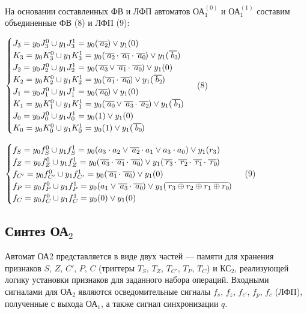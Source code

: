 На основании составленных ФВ и ЛФП автоматов ОА$^{(0)}_{1}$ и ОА$^{(1)}_{1}$ составим объединенные ФВ (8) и ЛФП (9):

$
\begin{cases}
J_3 = y_0 J^0_3 \cup y_1 J^1_3 = y_0 (\oline{a_2}) \vee y_1(0)
\\
K_3 = y_0 K^0_3 \cup y_1 K^1_3 = y_0 (\oline{a_2} \cdot \oline{a_1} \cdot \oline{a_0}) \vee y_1(\oline{b_3})
\\
J_2 = y_0 J^0_2 \cup y_1 J^1_2 = y_0 (\oline{a_3} \vee \oline{a_1} \cdot \oline{a_0}) \vee y_1(0)
\\
K_2 = y_0 K^0_2 \cup y_1 K^1_2 = y_0 (\oline{a_1} \cdot \oline{a_0}) \vee y_1(\oline{b_2})
\\
J_1 = y_0 J^0_1 \cup y_1 J^1_1 = y_0 (\oline{a_0}) \vee y_1(0)
\\
K_1 = y_0 K^0_1 \cup y_1 K^1_1 = y_0 (\oline{a_0} \vee \oline{a_3} \cdot \oline{a_2}) \vee y_1(\oline{b_1})
\\
J_0 = y_0 J^0_0 \cup y_1 J^1_0 = y_0 (1) \vee y_1(0)
\\
K_0 = y_0 K^0_0 \cup y_1 K^1_0 = y_0 (1) \vee y_1(\oline{b_0})
\end{cases}
$ (8)

$
\begin{cases}
f_S = y_0 f^0_S \cup y_1 f^1_S = y_0 (a_3 \cdot a_2 \vee \oline{a_2} \cdot a_1 \vee a_3 \cdot a_0) \vee y_1 (r_3)
\\
f_Z = y_0 f^0_Z \cup y_1 f^1_Z = y_0 (\oline{a_3} \cdot \oline{a_1} \cdot \oline{a_0}) \vee y_1 (\oline{r_3} \cdot \oline{r_2} \cdot \oline{r_1} \cdot \oline{r_0})
\\
f_{C'} = y_0 f^0_{C'} \cup y_1 f^1_{C'} = y_0 (\oline{a_1} \cdot \oline{a_0}) \vee y_1 (0)
\\
f_P = y_0 f^0_P \cup y_1 f^1_P = y_0 (a_1 \vee \oline{a_3} \cdot \oline{a_0}) \vee y_1 (\oline{r_3 \oplus r_2 \oplus r_1 \oplus r_0})
\\
f_C = y_0 f^0_C \cup y_1 f^1_C = y_0 (0) \vee y_1 (0)
\end{cases}
$ (9)



\clearpage
\subsection{Синтез ОА${}_2$}

 Автомат ОА2 представляется в виде двух частей --- памяти для хранения признаков $S$, $Z$, $C'$, $P$, $C$ (триггеры $T_S$, $T_Z$, $T_{C'}$, $T_P$, $T_C$) и КС$_2$, реализующей логику установки признаков для заданного набора операций. Входными сигналами для ОА$_2$ являются осведомительные сигналы $f_s$, $f_z$, $f_{c'}$, $f_p$, $f_c$ (ЛФП), полученные с выхода ОА$_{1}$, а также сигнал синхронизации $q$.

